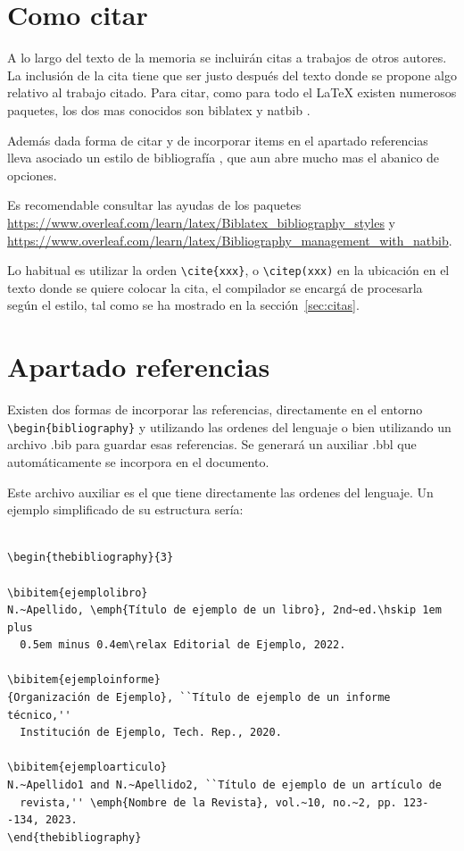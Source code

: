  \section{Como citar}
A lo largo del texto de la memoria se incluirán citas a trabajos de otros autores. La inclusión de la cita tiene que ser justo después del texto donde se propone algo relativo al trabajo citado. Para citar, como para todo el \LaTeX{} existen numerosos paquetes, los dos mas conocidos son  biblatex y   natbib .

Además dada forma de citar y de incorporar items en el apartado referencias lleva asociado un estilo de bibliografía    \lstinline[language=enparrafo]!!, que aun abre mucho mas el abanico de opciones.

Es recomendable consultar las ayudas de los paquetes \url{https://www.overleaf.com/learn/latex/Biblatex_bibliography_styles} y \url{https://www.overleaf.com/learn/latex/Bibliography_management_with_natbib}.

Lo habitual es utilizar la orden      \lstinline[language=enparrafo]!\cite{xxx}!, o   \lstinline[language=enparrafo]!\citep(xxx)!  en la ubicación en el texto donde se quiere colocar la cita, el compilador se encargá de procesarla según el estilo, tal como se ha mostrado en la sección~\ref{sec:citas}.

 \section {Apartado referencias}
  Existen dos formas de incorporar las referencias, directamente en el entorno   \lstinline[language=enparrafo]!\begin{bibliography}! y utilizando las ordenes del lenguaje o bien utilizando un archivo .bib para guardar esas referencias. Se generará un auxiliar .bbl que automáticamente se incorpora en el documento.

  Este archivo auxiliar es el que tiene directamente las ordenes del lenguaje. Un ejemplo simplificado de su estructura sería:

 \begin{verbatim}

\begin{thebibliography}{3}

\bibitem{ejemplolibro}
N.~Apellido, \emph{Título de ejemplo de un libro}, 2nd~ed.\hskip 1em plus
  0.5em minus 0.4em\relax Editorial de Ejemplo, 2022.

\bibitem{ejemploinforme}
{Organización de Ejemplo}, ``Título de ejemplo de un informe técnico,''
  Institución de Ejemplo, Tech. Rep., 2020.

\bibitem{ejemploarticulo}
N.~Apellido1 and N.~Apellido2, ``Título de ejemplo de un artículo de
  revista,'' \emph{Nombre de la Revista}, vol.~10, no.~2, pp. 123--134, 2023.
\end{thebibliography}

  \end{verbatim}



